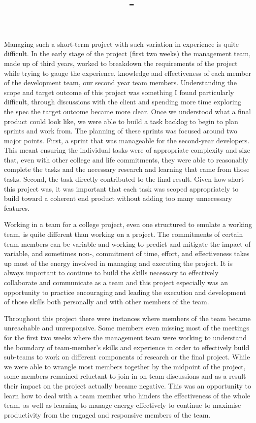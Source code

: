 \documentclass{article}
\title{
    \vspace{-1in}
    \textmd{\textbf{\moduleCode\ \moduleName}}\\
    \textmd{\textbf{\assignmentTitle}}\\
    \textmd{\authorName\ - \authorID}\\
}
\date{}
\author{}
\begin{document}
    \captionsetup{width=.8\linewidth} 

    \maketitle

    Managing such a short-term project with such variation in experience is quite difficult. In the early stage of the project (first two weeks) the management team, made up of third years, worked to breakdown the requirements of the project while trying to gauge the experience, knowledge and effectiveness of each member of the development team, our second year team members. Understanding the scope and target outcome of this project was something I found particularly difficult, through discussions with the client and spending more time exploring the spec the target outcome became more clear. Once we understood what a final product could look like, we were able to build a task backlog to begin to plan sprints and work from. The planning of these sprints was focused around two major points. First, a sprint that was manageable for the second-year developers. This meant ensuring the individual tasks were of appropriate complexity and size that, even with other college and life commitments, they were able to reasonably complete the tasks and the necessary research and learning that came from those tasks. Second, the task directly contributed to the final result. Given how short this project was, it was important that each task was scoped appropriately to build toward a coherent end product without adding too many unnecessary features.

    Working in a team for a college project, even one structured to emulate a working team, is quite different than working on a project. The commitments of certain team members can be variable and working to predict and mitigate the impact of variable, and sometimes non-, commitment of time, effort, and effectiveness takes up most of the energy involved in managing and executing the project. It is always important to continue to build the skills necessary to effectively collaborate and communicate as a team and this project especially was an opportunity to practice encouraging and leading the execution and development of those skills both personally and with other members of the team.

    Throughout this project there were instances where members of the team became unreachable and unresponsive. Some members even missing most of the meetings for the first two weeks where the management team were working to understand the boundary of team-member's skills and experience in order to effectively build sub-teams to work on different components of research or the final project. While we were able to wrangle most members together by the midpoint of the project, some members remained reluctant to join in on team discussions and as a result their impact on the project actually became negative. This was an opportunity to learn how to deal with a team member who hinders the effectiveness of the whole team, as well as learning to manage energy effectively to continue to maximise productivity from the engaged and responsive members of the team.
\end{document}
